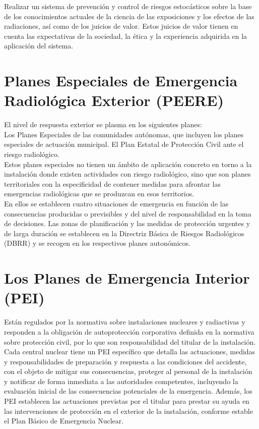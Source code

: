 \documentclass[]{article}
\begin{document}
Realizar un sistema de prevención y control de riesgos estocásticos sobre la base de los conocimientos actuales de la ciencia de las exposiciones y los efectos de las radiaciones, así como de los juicios de valor. Estos juicios de valor tienen en cuenta las expectativas de la sociedad, la ética y la experiencia adquirida en la aplicación del sistema.

\section{Planes Especiales de Emergencia Radiológica Exterior (PEERE)}

El nivel de respuesta exterior se plasma en los siguientes planes:\\

Los Planes Especiales de las comunidades autónomas, que incluyen los planes especiales de actuación municipal.
El Plan Estatal de Protección Civil ante el riesgo radiológico.\\

Estos planes especiales no tienen un ámbito de aplicación concreto en torno a la instalación donde existen actividades con riesgo radiológico, sino que son planes territoriales con la especificidad de contener medidas para afrontar las emergencias radiológicas que se produzcan en esos territorios.\\

En ellos se establecen cuatro situaciones de emergencia en función de las consecuencias producidas o previsibles y del nivel de responsabilidad en la toma de decisiones. Las zonas de planificación y las medidas de protección urgentes y de larga duración se establecen en la Directriz Básica de Riesgos Radiológicos (DBRR) y se recogen en los respectivos planes autonómicos.\\


\section{Los Planes de Emergencia Interior (PEI)}

 Están regulados por la normativa sobre instalaciones nucleares y radiactivas y responden a la obligación de autoprotección corporativa definida en la normativa sobre protección civil, por lo que son responsabilidad del titular de la instalación.\\

Cada central nuclear tiene un PEI específico que detalla las actuaciones, medidas y responsabilidades de preparación y respuesta a las condiciones del accidente, con el objeto de mitigar sus consecuencias, proteger al personal de la instalación y notificar de forma inmediata a las autoridades competentes, incluyendo la evaluación inicial de las consecuencias potenciales de la emergencia. Además, los PEI establecen las actuaciones previstas por el titular para prestar su ayuda en las intervenciones de protección en el exterior de la instalación, conforme estable el Plan Básico  de Emergencia Nuclear.\\



%
%
\end{document}
